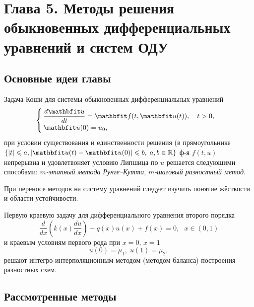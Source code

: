 \newpage
{}
\pagestyle{empty}
\vspace{0.5cm}

\section*{Глава 5. Методы решения обыкновенных дифференциальных уравнений и систем ОДУ}

\subsection{Основные идеи главы} 

Задача Коши для системы обыкновенных дифференциальных уравнений
\begin{equation}
%
    \label{Koshi_sys}
    \begin{cases}
        \dfrac{d\vfunc{u}}{dt} = \vfunc{f}(t, \vfunc{u}(t)), \quad t > 0, \\
        \vfunc{u}(0) = u_0,
    \end{cases}
\end{equation}
при условии существования и единственности решения (в прямоугольнике $\{|t| \leqslant a, | \vfunc{u}(t)-\vfunc{u}(0)| \leqslant b,\; a, b\in\mathbb{R}\}$ ф-я $f(t, u)$ непрерывна и удовлетвоняет условию Липшица по $u$ решается следующими способами: \textit{$m$-этапный метода Рунге--Кутта}, \textit{ $m$-шаговый разностный метод}.

При переносе методов на систему уравнений следует изучить понятие жёсткости и области устойчивости.
 
Первую краевую задачу для дифференциального уравнения второго порядка
\begin{equation}
    \label{eq:2-ord-eq}
    \dfrac{d}{dx}\left(k(x)\dfrac{du}{dx}\right) - q(x)u(x) + f(x) = 0, ~~~x\in(0,1)
\end{equation}
%
и краевым условиям первого рода при $x=0$, $x=1$
%
\begin{equation}
    \label{eq:2-ord-eq-bounds}
    u(0) = \mu_1,\;u(1) = \mu_2,
\end{equation}
%
решают интегро-интерполяционным методом (методом баланса) построения разностных схем.

\subsection{Рассмотренные методы}